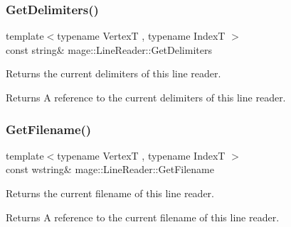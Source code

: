 \subsubsection{\texorpdfstring{Get\+Delimiters()}{GetDelimiters()}}
{\footnotesize\ttfamily template$<$typename VertexT , typename IndexT $>$ \\
const string\& mage\+::\+Line\+Reader\+::\+Get\+Delimiters\hspace{0.3cm}{\ttfamily [noexcept]}}

Returns the current delimiters of this line reader.

\begin{DoxyReturn}{Returns}
A reference to the current delimiters of this line reader. 
\end{DoxyReturn}
\mbox{\label{classmage_1_1rendering_1_1loader_1_1_o_b_j_reader_a682ed8030c99a62d4409a01f9efa6d6b}} 
\subsubsection{\texorpdfstring{Get\+Filename()}{GetFilename()}}
{\footnotesize\ttfamily template$<$typename VertexT , typename IndexT $>$ \\
const wstring\& mage\+::\+Line\+Reader\+::\+Get\+Filename\hspace{0.3cm}{\ttfamily [noexcept]}}

Returns the current filename of this line reader.

\begin{DoxyReturn}{Returns}
A reference to the current filename of this line reader. 
\end{DoxyReturn}
\mbox{\label{classmage_1_1rendering_1_1loader_1_1_o_b_j_reader_a006549a7f9724580c7fdae2f7a9c7bdf}} 
